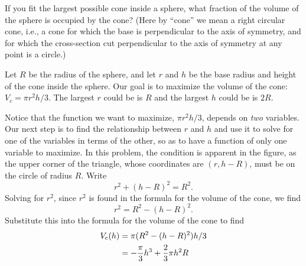 \documentclass{ximera}
\begin{document}
\begin{example}
If you fit the largest possible cone inside a sphere, what fraction of the
volume of the sphere is occupied by the cone?  (Here by ``cone'' we mean a
right circular cone, i.e., a cone for which the base is perpendicular to
the axis of symmetry, and for which the cross-section cut perpendicular to
the axis of symmetry at any point is a circle.)
\begin{image}
\end{image}
\begin{explanation}
Let $R$ be the radius of the sphere, and let $r$ and $h$ be the base
radius and height of the cone inside the sphere.  Our goal is to
maximize the volume of the cone: $V_c=\pi r^2h/3$.  The largest $r$
could be is $R$ and the largest $h$ could be is $2R$.

Notice that the function we want to maximize, $\pi r^2h/3$, depends on
\textit{two} variables.  Our next step is to find the relationship between $r$ and $h$ and
use it to solve for one of the variables in terms of the other, so as
to have a function of only one variable to maximize.  In this problem,
the condition is apparent in the figure, as the upper corner of the
triangle, whose coordinates are $(r,h-R)$, must be on the circle of
radius $R$. Write
\[
r^2 + (h-R)^2=R^2.
\] 
Solving for $r^2$, since $r^2$ is found in the formula for the volume
of the cone, we find 
\[
r^2=R^2-(h-R)^2.
\]  
Substitute this into the formula for the volume of the cone to find
\begin{align*}
 V_{\text{c}}(h)&=\pi(R^2-(h-R)^2)h/3 \\
&=-{\pi\over3}h^3+{2\over3}\pi h^2R
\end{align*}


\end{explanation}
\end{example}
\end{document}
